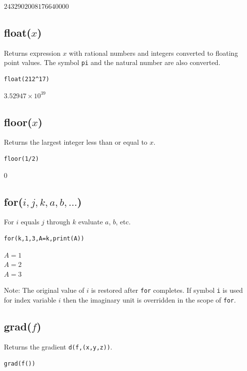 \documentclass[12pt]{article}
\begin{document}
\noindent
$2432902008176640000$

\subsection*{float($x$)}

Returns expression $x$ with rational numbers and integers converted to
floating point values.
The symbol {\tt pi} and the natural number are also converted.

{\color{blue}
\begin{verbatim}
float(212^17)
\end{verbatim}
}

\noindent
$\displaystyle 3.52947\times 10^{39}$

\subsection*{floor($x$)}

Returns the largest integer less than or equal to $x$.

{\color{blue}
\begin{verbatim}
floor(1/2)
\end{verbatim}
}

\noindent
$0$

\subsection*{for($i,j,k,a,b,\ldots$)}

For $i$ equals $j$ through $k$ evaluate $a$, $b$, etc.

{\color{blue}
\begin{verbatim}
for(k,1,3,A=k,print(A))
\end{verbatim}
}

\noindent
$A=1$\\
$A=2$\\
$A=3$

\bigskip
\noindent
Note: The original value of $i$ is restored after {\tt for} completes.
If symbol {\tt i} is used for index variable $i$
then the imaginary unit is overridden in the scope of {\tt for}.

\subsection*{grad($f$)}

Returns the gradient \verb$d(f,(x,y,z))$.

{\color{blue}
\begin{verbatim}
grad(f())
\end{verbatim}
}
\end{document}
